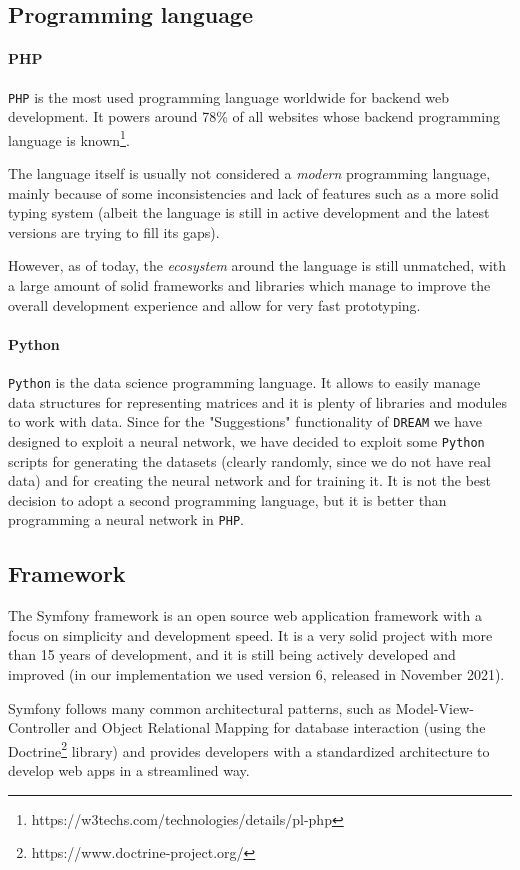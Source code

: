 \documentclass{article}
\begin{document}
\subsection{Programming language}
\paragraph{PHP} \verb|PHP| is the most used programming language worldwide for backend web development. It powers around 78\% of all websites whose backend programming language is known\footnote{https://w3techs.com/technologies/details/pl-php}.

The language itself is usually not considered a \textit{modern} programming language, mainly because of some inconsistencies and lack of features such as a more solid typing system (albeit the language is still in active development and the latest versions are trying to fill its gaps).

However, as of today, the \textit{ecosystem} around the language is still unmatched, with a large amount of solid frameworks and libraries which manage to improve the overall development experience and allow for very fast prototyping.
\paragraph{Python} \verb|Python| is the data science programming language. It allows to easily manage data structures for representing matrices and it is plenty of libraries and modules to work with data. Since for the "Suggestions" functionality of \verb|DREAM| we have designed to exploit a neural network, we have decided to exploit some \verb|Python| scripts for generating the datasets (clearly randomly, since we do not have real data) and for creating the neural network and for training it. It is not the best decision to adopt a second programming language, but it is better than programming a neural network in \verb|PHP|.
\subsection{Framework}
The Symfony framework is an open source web application framework with a focus on simplicity and development speed. It is a very solid project with more than 15 years of development, and it is still being actively developed and improved (in our implementation we used version 6, released in November 2021).

Symfony follows many common architectural patterns, such as Model-View-Controller and Object Relational Mapping for database interaction (using the Doctrine\footnote{https://www.doctrine-project.org/} library) and provides developers with a standardized architecture to develop web apps in a streamlined way.
\end{document}
